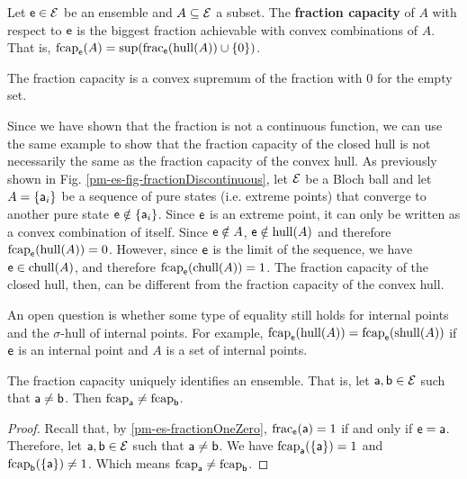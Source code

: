 \begin{mathSection}
	\begin{defn}
		Let $\ens \in \Ens$ be an ensemble and $A \subseteq \Ens$ a subset. The \textbf{fraction capacity} of $A$ with respect to $\ens$ is the biggest fraction achievable with convex combinations of $A$. That is, $\fcap_{\ens}(A) = \sup(\fraction_{\ens}(\hull(A))\cup\{0\})$.
	\end{defn}

	\begin{coro}
		The fraction capacity is a convex supremum of the fraction with $0$ for the empty set.
	\end{coro}
	
	\begin{remark}
		Since we have shown that the fraction is not a continuous function, we can use the same example to show that the fraction capacity of the closed hull is not necessarily the same as the fraction capacity of the convex hull. As previously shown in Fig. \ref{pm-es-fig-fractionDiscontinuous}, let $\Ens$ be a Bloch ball and let $A=\{\ens[a]_i\}$ be a sequence of pure states (i.e. extreme points) that converge to another pure state $\ens \notin \{\ens[a]_i\}$. Since $\ens$ is an extreme point, it can only be written as a convex combination of itself. Since $\ens \notin A$, $\ens \notin \hull(A)$ and therefore $\fcap_{\ens}(\hull(A))=0$. However, since $\ens$ is the limit of the sequence, we have $\ens \in \chull(A)$, and therefore $\fcap_{\ens}(\chull(A)) = 1$. The fraction capacity of the closed hull, then, can be different from the fraction capacity of the convex hull.
		
		An open question is whether some type of equality still holds for internal points and the $\sigma$-hull of internal points. For example, $\fcap_{\ens}(\hull(A)) = \fcap_{\ens}(\shull(A))$ if $\ens$ is an internal point and $A$ is a set of internal points.
	\end{remark}

	\begin{coro}
		The fraction capacity uniquely identifies an ensemble. That is, let $\ens[a], \ens[b] \in \Ens$ such that $\ens[a] \neq \ens[b]$. Then $\fcap_{\ens[a]} \neq \fcap_{\ens[b]}$.
	\end{coro}
	
	\begin{proof}
		Recall that, by \ref{pm-es-fractionOneZero}, $\fraction_{\ens}(\ens[a]) = 1$ if and only if $\ens = \ens[a]$. Therefore, let $\ens[a], \ens[b] \in \Ens$ such that $\ens[a] \neq \ens[b]$. We have $\fcap_{\ens[a]}(\{\ens[a]\}) = 1$ and $\fcap_{\ens[b]}(\{\ens[a]\}) \neq 1$. Which means $\fcap_{\ens[a]} \neq \fcap_{\ens[b]}$.
	\end{proof}
	

\end{mathSection}
